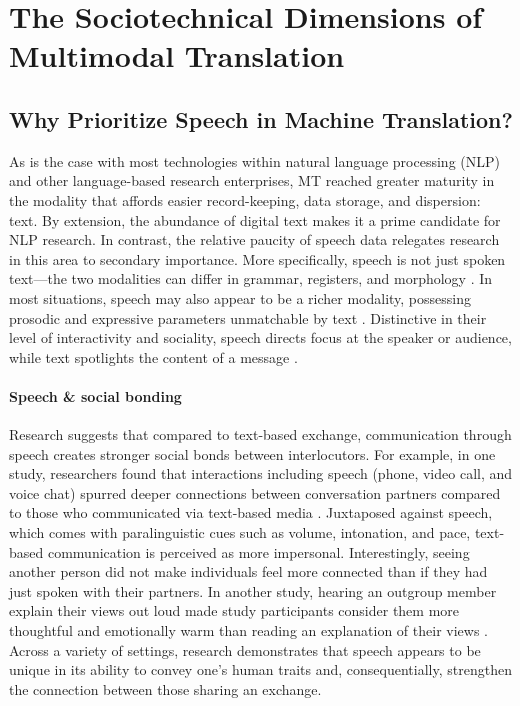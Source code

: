 \FloatBarrier
\section{The Sociotechnical Dimensions of Multimodal Translation}
\label{sec:appendix:problem}

\subsection{Why Prioritize Speech in Machine Translation?}
As is the case with most technologies within natural language processing (NLP) and other language-based research enterprises, MT reached greater maturity in the modality that affords easier record-keeping, data storage, and dispersion: text. By extension, the abundance of digital text makes it a prime candidate for NLP research. In contrast, the relative paucity of speech data relegates research in this area to secondary importance. More specifically, speech is not just spoken text—the two modalities can differ in grammar, registers, and morphology \citep{plag1999morphological}. In most situations, speech may also appear to be a richer modality, possessing prosodic and expressive parameters unmatchable by text \citep{kraut1992task}. Distinctive in their level of interactivity and sociality, speech directs focus at the speaker or audience, while text spotlights the content of a message \citep{kraut1992task}.


\paragraph{Speech \& social bonding} Research suggests that compared to text-based exchange, communication through speech creates stronger social bonds between interlocutors. For example, in one study, researchers found that interactions including speech (phone, video call, and voice chat) spurred deeper connections between conversation partners compared to those who communicated via text-based media \citep[595]{kumar2021s}. Juxtaposed against speech, which comes with paralinguistic cues such as volume, intonation, and pace, text-based communication is perceived as more impersonal. Interestingly, seeing another person did not make individuals feel more connected than if they had just spoken with their partners. In another study, hearing an outgroup member explain their views out loud made study participants consider them more thoughtful and emotionally warm than reading an explanation of their views \citep{schroeder2017humanizing}. Across a variety of settings, research demonstrates that speech appears to be unique in its ability to convey one's human traits and, consequentially, strengthen the connection between those sharing an exchange.

